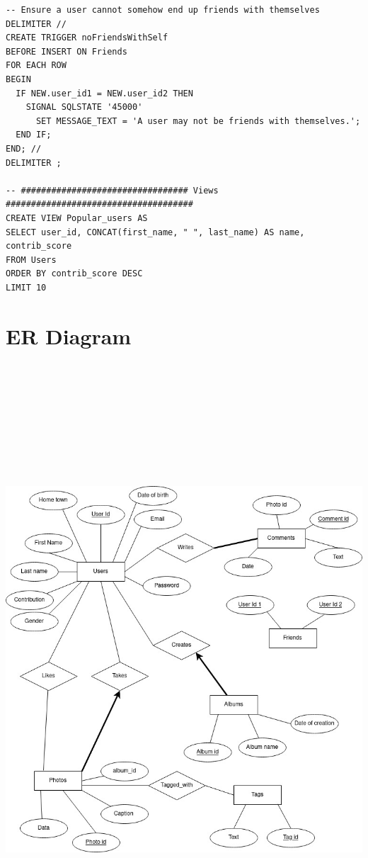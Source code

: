 \documentclass[letterpaper]{article}
\begin{document}
\begin{verbatim}
-- Ensure a user cannot somehow end up friends with themselves
DELIMITER //
CREATE TRIGGER noFriendsWithSelf
BEFORE INSERT ON Friends
FOR EACH ROW
BEGIN
  IF NEW.user_id1 = NEW.user_id2 THEN
    SIGNAL SQLSTATE '45000'
      SET MESSAGE_TEXT = 'A user may not be friends with themselves.';
  END IF;
END; //
DELIMITER ;

-- ################################# Views #####################################
CREATE VIEW Popular_users AS
SELECT user_id, CONCAT(first_name, " ", last_name) AS name, contrib_score
FROM Users
ORDER BY contrib_score DESC
LIMIT 10

  \end{verbatim}
  \section{ER Diagram}
  \includegraphics[width=6.5in, height=9in]{ER_diagram}
\end{document}
